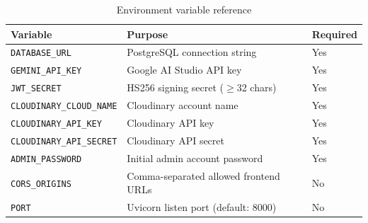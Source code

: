 \documentclass[12pt,a4paper]{article}
\begin{document}
\begin{table}[H]
\centering
\begin{tabularx}{\linewidth}{@{}lXl@{}}
\toprule
\textbf{Variable} & \textbf{Purpose} & \textbf{Required} \\
\midrule
\texttt{DATABASE\_URL}          & PostgreSQL connection string & Yes \\
\texttt{GEMINI\_API\_KEY}       & Google AI Studio API key & Yes \\
\texttt{JWT\_SECRET}            & HS256 signing secret ($\geq$32 chars) & Yes \\
\texttt{CLOUDINARY\_CLOUD\_NAME} & Cloudinary account name & Yes \\
\texttt{CLOUDINARY\_API\_KEY}   & Cloudinary API key & Yes \\
\texttt{CLOUDINARY\_API\_SECRET} & Cloudinary API secret & Yes \\
\texttt{ADMIN\_PASSWORD}        & Initial admin account password & Yes \\
\texttt{CORS\_ORIGINS}          & Comma-separated allowed frontend URLs & No \\
\texttt{PORT}                   & Uvicorn listen port (default: 8000) & No \\
\bottomrule
\end{tabularx}
\caption{Environment variable reference}
\end{table}

\end{document}
